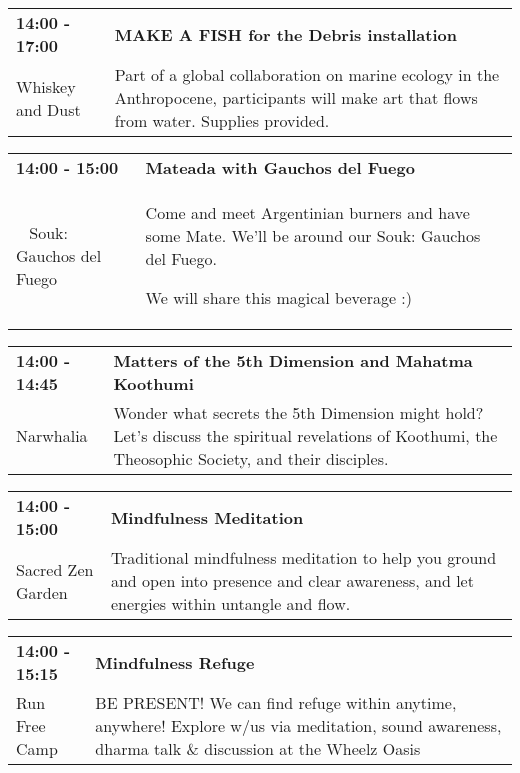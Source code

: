 \begin{tabular}{ p{1in} p{2.2in} }
    \textbf{14:00 - 17:00} & \textbf{MAKE A FISH for the Debris installation} \\
    Whiskey and Dust \newline  & Part of a global collaboration on marine ecology in the Anthropocene, participants will make art that flows from water. Supplies provided. \\
    \hline 
\end{tabular}
    
\begin{tabular}{ p{1in} p{2.2in} }
    \textbf{14:00 - 15:00} & \textbf{Mateada with Gauchos del Fuego} \\
    ~ \newline Souk: Gauchos del Fuego & Come and meet Argentinian burners and have some Mate. We'll be around our Souk: Gauchos del Fuego.

We will share this magical beverage :) \\
    \hline 
\end{tabular}
    
\begin{tabular}{ p{1in} p{2.2in} }
    \textbf{14:00 - 14:45} & \textbf{Matters of the 5th Dimension and Mahatma Koothumi} \\
    Narwhalia \newline  & Wonder what secrets the 5th Dimension might hold? Let's discuss the spiritual revelations of Koothumi, the Theosophic Society, and their disciples. \\
    \hline 
\end{tabular}
    
\begin{tabular}{ p{1in} p{2.2in} }
    \textbf{14:00 - 15:00} & \textbf{Mindfulness Meditation} \\
    Sacred Zen Garden \newline  & Traditional mindfulness meditation to help you ground and open into presence and clear awareness, and let energies within untangle and flow. \\
    \hline 
\end{tabular}
    
\begin{tabular}{ p{1in} p{2.2in} }
    \textbf{14:00 - 15:15} & \textbf{Mindfulness Refuge} \\
    Run Free Camp \newline  & BE PRESENT! We can find refuge within anytime, anywhere! Explore w/us via meditation, sound  awareness, dharma talk \& discussion at the Wheelz Oasis \\
    \hline 
\end{tabular}
    
